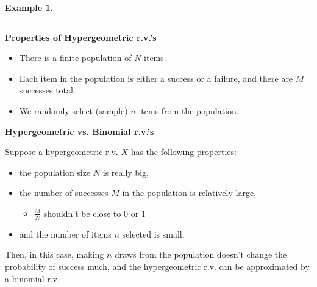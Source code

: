 \documentclass[12pt]{amsart}
\newtheorem{example}[theorem]{Example}
\begin{document}
{\begin{example}
\end{example}
\vspace{4cm}
\hrule
\vspace{.5cm}



\textbf{Properties of Hypergeometric r.v.'s}

\begin{itemize}
\item There is a finite population of $N$ items. 
\item Each item in the population is either a success or a failure, and there are $M$ successes total.
\item We randomly select (sample) $n$ items from the population. 
\end{itemize}

\newpage



\textbf{Hypergeometric vs. Binomial r.v.'s}
\vspace{.5cm}

Suppose a hypergeometric r.v. $X$ has the following properties:
\begin{itemize}
\item the population size $N$ is really big,
\item the number of successes $M$ in the population is relatively large,
	\begin{itemize}
	\item $\frac{M}{N}$ shouldn't be close to 0 or 1
	\end{itemize}
\item and the number of items $n$ selected is small.
\end{itemize}
\vspace{.5cm}
Then, in this case, making $n$ draws from the population doesn't change the probability of success much, and the hypergeometric r.v. can be approximated by a binomial r.v.

\vspace{.5cm}

\vspace{5cm}



}
\end{document}
